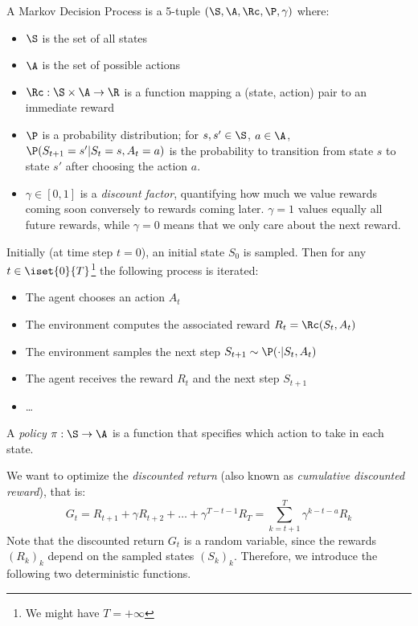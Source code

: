 \begin{definition}
    A Markov Decision Process is a 5-tuple $(\S, \A, \Rc, \P, \gamma)$ where:
    \begin{itemize}
        \item $\S$ is the set of all states
        \item $\A$ is the set of possible actions
        \item $\Rc:\S\times\A\to\R$ is a function mapping a (state, action) pair to an immediate reward
        \item $\P$ is a probability distribution; for $s,s'\in\S$, $a\in\A$, $\P(S_{t+1}=s'|S_t=s,A_t=a)$ is the probability to transition from state $s$ to state $s'$ after choosing the action $a$.
        \item $\gamma\in[0,1]$ is a \emph{discount factor}, quantifying how much we value rewards coming soon conversely to rewards coming later. $\gamma=1$ values equally all future rewards, while $\gamma=0$ means that we only care about the next reward.
    \end{itemize}

    Initially (at time step $t=0$), an initial state $S_0$ is sampled. Then for any $t\in\iset{0}{T}$\footnote{We might have $T=+\infty$} the following process is iterated:
    \begin{itemize}
        \item The agent chooses an action $A_t$
        \item The environment computes the associated reward $R_t=\Rc(S_t,A_t)$
        \item The environment samples the next step $S_{t+1}\sim\P(\cdot|S_t,A_t)$
        \item The agent receives the reward $R_t$ and the next step $S_{t+1}$
        \item \dots
    \end{itemize}
\end{definition}

\begin{definition}[Policy]
    A \emph{policy} $\pi:\S\to\A$ is a function that specifies which action to take in each state.
\end{definition}

We want to optimize the \emph{discounted return} (also known as \emph{cumulative discounted reward}), that is:
\begin{equation*}
    G_t=R_{t+1}+\gamma R_{t+2}+\dots+\gamma^{T-t-1}R_T = \sum_{k=t+1}^T\gamma^{k-t-a}R_k
\end{equation*}
Note that the discounted return $G_t$ is a random variable, since the rewards $(R_k)_k$ depend on the sampled states $(S_k)_k$. 
Therefore, we introduce the following two deterministic functions.

